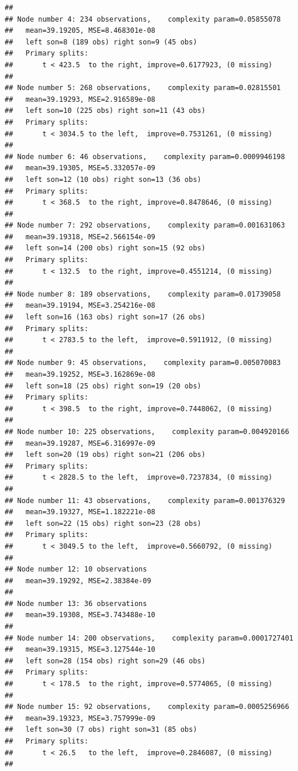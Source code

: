 \documentclass[
]{book}
\begin{document}
\begin{verbatim}
## 
## Node number 4: 234 observations,    complexity param=0.05855078
##   mean=39.19205, MSE=8.468301e-08 
##   left son=8 (189 obs) right son=9 (45 obs)
##   Primary splits:
##       t < 423.5  to the right, improve=0.6177923, (0 missing)
## 
## Node number 5: 268 observations,    complexity param=0.02815501
##   mean=39.19293, MSE=2.916589e-08 
##   left son=10 (225 obs) right son=11 (43 obs)
##   Primary splits:
##       t < 3034.5 to the left,  improve=0.7531261, (0 missing)
## 
## Node number 6: 46 observations,    complexity param=0.0009946198
##   mean=39.19305, MSE=5.332057e-09 
##   left son=12 (10 obs) right son=13 (36 obs)
##   Primary splits:
##       t < 368.5  to the right, improve=0.8478646, (0 missing)
## 
## Node number 7: 292 observations,    complexity param=0.001631063
##   mean=39.19318, MSE=2.566154e-09 
##   left son=14 (200 obs) right son=15 (92 obs)
##   Primary splits:
##       t < 132.5  to the right, improve=0.4551214, (0 missing)
## 
## Node number 8: 189 observations,    complexity param=0.01739058
##   mean=39.19194, MSE=3.254216e-08 
##   left son=16 (163 obs) right son=17 (26 obs)
##   Primary splits:
##       t < 2783.5 to the left,  improve=0.5911912, (0 missing)
## 
## Node number 9: 45 observations,    complexity param=0.005070083
##   mean=39.19252, MSE=3.162869e-08 
##   left son=18 (25 obs) right son=19 (20 obs)
##   Primary splits:
##       t < 398.5  to the right, improve=0.7448062, (0 missing)
## 
## Node number 10: 225 observations,    complexity param=0.004920166
##   mean=39.19287, MSE=6.316997e-09 
##   left son=20 (19 obs) right son=21 (206 obs)
##   Primary splits:
##       t < 2828.5 to the left,  improve=0.7237834, (0 missing)
## 
## Node number 11: 43 observations,    complexity param=0.001376329
##   mean=39.19327, MSE=1.182221e-08 
##   left son=22 (15 obs) right son=23 (28 obs)
##   Primary splits:
##       t < 3049.5 to the left,  improve=0.5660792, (0 missing)
## 
## Node number 12: 10 observations
##   mean=39.19292, MSE=2.38384e-09 
## 
## Node number 13: 36 observations
##   mean=39.19308, MSE=3.743488e-10 
## 
## Node number 14: 200 observations,    complexity param=0.0001727401
##   mean=39.19315, MSE=3.127544e-10 
##   left son=28 (154 obs) right son=29 (46 obs)
##   Primary splits:
##       t < 178.5  to the right, improve=0.5774065, (0 missing)
## 
## Node number 15: 92 observations,    complexity param=0.0005256966
##   mean=39.19323, MSE=3.757999e-09 
##   left son=30 (7 obs) right son=31 (85 obs)
##   Primary splits:
##       t < 26.5   to the left,  improve=0.2846087, (0 missing)
## 

\end{verbatim}
\end{document}
